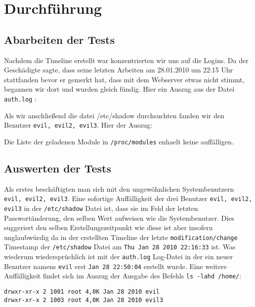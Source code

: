 \section{Durchführung}
\subsection{Abarbeiten der Tests}
Nachdem die Timeline erstellt war konzentrierten wir uns auf die Logins. Da der Geschädigte sagte, dass seine letzten Arbeiten am 28.01.2010 um 22:15 Uhr stattfanden bevor er gemerkt hat, dass mit dem Webserver etwas nicht stimmt, begannen wir dort und wurden gleich fündig.
Hier ein Auszug aus der Datei \texttt{auth.log} :
\lstset{basicstyle=\footnotesize, breaklines=true, breakatwhitespace=true}


Als wir anschließend die datei /etc/shadow durchsuchten fanden wir den Benutzer \texttt{evil, evil2, evil3}. Hier der Auszug:
%

Die Liste der geladenen Module in \texttt{/proc/modules} enhaelt keine auffälligen.

\subsection{Auswerten der Tests}
Als erstes beschäftigten man sich mit den ungewöhnlichen Systembenutzern \texttt{evil, evil2, evil3}. Eine sofortige Auffälligkeit der drei Benutzer \texttt{evil, evil2, evil3} in der \texttt{/etc/shadow} Datei ist, dass sie im Feld der letzten Passwortänderung, den selben Wert aufweisen wie die Systembenutzer. Dies suggeriert den selben Erstellungszeitpunkt wie diese ist aber insofern unglaubwürdig da in der erstellten Timeline der letzte \texttt{modification/change} Timestamp der \texttt{/etc/shadow} Datei am \texttt{Thu Jan 28 2010 22:16:33} ist. Was wiederum wiedersprüchlich ist mit der \texttt{auth.log} Log-Datei in der ein neuer Benutzer namens \texttt{evil} erst \texttt{Jan 28 22:50:04} erstellt wurde.
Eine weitere Auffälligkeit findet sich im Auszug der Ausgabe des Befehls \texttt{ls -lahd /home/}:
\begin{verbatim}
drwxr-xr-x 2 1001 root 4,0K Jan 28 2010 evil
drwxr-xr-x 2 1003 root 4,0K Jan 28 2010 evil3
\end{verbatim}